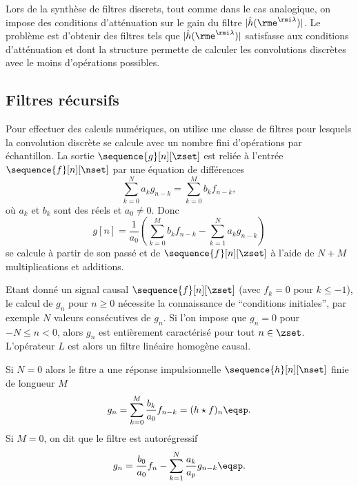 Lors de la synth\`ese de filtres discrets, tout comme dans le
cas analogique, on impose des conditions
d'att\'enuation sur le gain du filtre $|\hat h ({\rme^{\rmi \lambda}})|$.
Le probl\`eme est d'obtenir des filtres tels
que $|\hat h ({\rme^{\rmi \lambda}})|$ satisfasse aux conditions d'att\'enuation et
dont la structure permette de calculer les convolutions discr\`etes
avec le moins d'op\'erations possibles.

\subsection{Filtres r\'ecursifs}
\label{recursifs}
Pour effectuer des calculs num\'eriques, on utilise
une classe de filtres pour lesquels la convolution discr\`ete
se calcule avec un nombre fini d'op\'erations par
\'echantillon.
La sortie $\sequence{g}[n][\zset]$ est reliée à l'entrée $\sequence{f}[n][\nset]$
par une \'equation de diff\'erences
\begin{equation}
\label{recurr}
\sum_{k=0}^N a_k g_{n-k} = \sum_{k=0}^M b_k f_{n-k} ,
\end{equation}
o\`u $a_k$ et $b_k$ sont des r\'eels et $a_0 \neq 0$.
Donc
\[
g[n] = \frac 1 {a_0} \left(
\sum_{k=0}^M b_k f_{n-k} - \sum_{k=1}^N a_k g_{n-k} \right)
\]
se calcule \`a partir de son pass\'e et de $\sequence{f}[n][\zset]$ \`a l'aide de
$N+M$ multiplications et additions.

Etant donn\'e un signal causal $\sequence{f}[n][\zset]$ (avec $f_k=0$ pour $k \leq -1$),
le calcul de $g_n$ pour $n \geq 0$ n\'ecessite la connaissance de ``conditions initiales'',
par exemple $N$ valeurs cons\'ecutives de $g_n$.
Si l'on impose que $g_n = 0$ pour $-N \leq n < 0$, alors
$g_n$ est enti\`erement caract\'eris\'e pour tout $n \in \zset$.
L'op\'erateur $L$ est alors un filtre lin\'eaire homog\`ene causal.

Si $N = 0$ alors le fitre a une r\'eponse impulsionnelle $\sequence{h}[n][\nset]$ finie
de longueur $M$
\[
g_n =
\sum_{k=0}^M \frac {b_k} {a_0} f_{n-k} = (h \star f)_n \eqsp.
\]
Si $M = 0$, on dit que le filtre est autor\'egressif
\[
g_n = \frac {b_0} {a_0} f_n - \sum_{k=1}^N \frac{a_k} {a_p} g_{n-k} \eqsp.
\]
